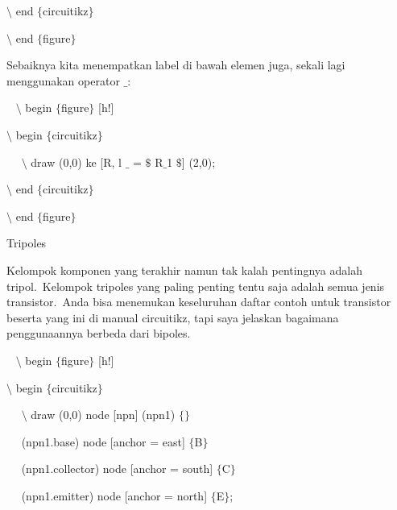 \noindent 
 $\setminus$ end $ \{ $circuitikz$ \} $
\par


\noindent 
 $\setminus$ end $ \{ $figure$ \} $ 
\par


\noindent 
Sebaiknya kita menempatkan label di bawah elemen juga, sekali lagi menggunakan operator $ \_ $:
\par


\noindent 
~ $\setminus$ begin $ \{ $figure$ \} $ [h!]
\par


\noindent 
 $\setminus$ begin $ \{ $circuitikz$ \} $
\par


\noindent 
~~ $\setminus$ draw (0,0) ke [R, l $ \_ $ = $\$$ R$ \_ $1 $\$$] (2,0);
\par


\noindent 
 $\setminus$ end $ \{ $circuitikz$ \} $
\par


\noindent 
 $\setminus$ end $ \{ $figure$ \} $ 
\par


\noindent 
Tripoles
\par


\noindent 
Kelompok komponen yang terakhir namun tak kalah pentingnya adalah tripol. Kelompok tripoles yang paling penting tentu saja adalah semua jenis transistor. Anda bisa menemukan keseluruhan daftar contoh untuk transistor beserta yang ini di manual circuitikz, tapi saya jelaskan bagaimana penggunaannya berbeda dari bipoles.
\par


\noindent 
~ $\setminus$ begin $ \{ $figure$ \} $ [h!]
\par


\noindent 
 $\setminus$ begin $ \{ $circuitikz$ \} $
\par


\noindent 
~~ $\setminus$ draw (0,0) node [npn] (npn1) $ \{ $$ \} $
\par


\noindent 
~~ (npn1.base) node [anchor = east] $ \{ $B$ \} $
\par


\noindent 
~~ (npn1.collector) node [anchor = south] $ \{ $C$ \} $
\par


\noindent 
~~ (npn1.emitter) node [anchor = north] $ \{ $E$ \} $;
\par


